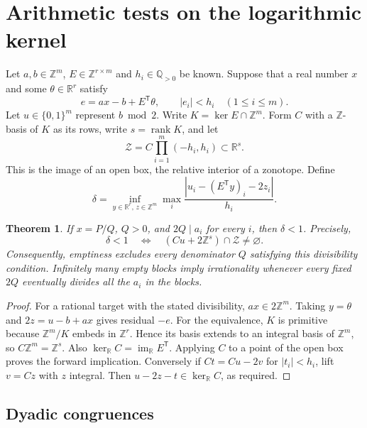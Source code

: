 \documentclass[11pt,a4paper]{article}
\newtheorem{theorem}{Theorem}[section]
\theoremstyle{definition}\newtheorem{definition}[theorem]{Definition}\newtheorem{example}[theorem]{Example}
\theoremstyle{remark}\newtheorem{remark}[theorem]{Remark}
\newcommand{\Q}{\mathbb Q}\newcommand{\Z}{\mathbb Z}\newcommand{\R}{\mathbb R}\newcommand{\N}{\mathbb N}
\begin{document}
\section{Arithmetic tests on the logarithmic kernel}\label{sec:parity}

Let $a,b\in\Z^m$, $E\in\Z^{r\times m}$ and $h_i\in\Q_{>0}$ be known. Suppose that a real number $x$ and some $\theta\in\R^r$ satisfy
\[
 e=ax-b+E^{\mathsf T}\theta,\qquad |e_i|<h_i\quad(1\le i\le m).
\]
Let $u\in\{0,1\}^m$ represent $b\bmod2$. Write $K=\ker E\cap\Z^m$. Form $C$ with a $\Z$-basis of $K$ as its rows, write $s=\operatorname{rank} K$, and let
\[
 \mathcal Z=C\prod_{i=1}^m(-h_i,h_i)\subset\R^s.
\]
This is the image of an open box, the relative interior of a zonotope. Define
\[
 \delta=\inf_{y\in\R^r,\,z\in\Z^m}
       \max_i\frac{|u_i-(E^{\mathsf T}y)_i-2z_i|}{h_i}.
\]

\begin{theorem}
If $x=P/Q$, $Q>0$, and $2Q\mid a_i$ for every $i$, then $\delta<1$.
Precisely,
\[
 \delta<1\quad\Longleftrightarrow\quad
 (Cu+2\Z^s)\cap\mathcal Z\ne\varnothing.
\]
Consequently, emptiness excludes every denominator $Q$ satisfying this divisibility condition. Infinitely many empty blocks imply irrationality whenever every fixed $2Q$ eventually divides all the $a_i$ in the blocks.
\end{theorem}

\begin{proof}
For a rational target with the stated divisibility, $ax\in2\Z^m$. Taking $y=\theta$ and $2z=u-b+ax$ gives residual $-e$. For the equivalence, $K$ is primitive because $\Z^m/K$ embeds in $\Z^r$. Hence its basis extends to an integral basis of $\Z^m$, so $C\Z^m=\Z^s$. Also $\ker_{\R}C=\operatorname{im}_{\R}E^{\mathsf T}$. Applying $C$ to a point of the open box proves the forward implication. Conversely if $Ct=Cu-2v$ for $|t_i|<h_i$, lift $v=Cz$ with $z$ integral. Then $u-2z-t\in\ker_{\R}C$, as required.
\end{proof}
\subsection{Dyadic congruences}
\end{document}

